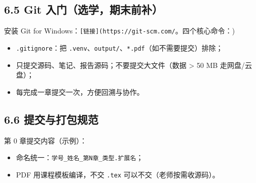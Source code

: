 \subsection{6.5 Git
入门（选学，期末前补）}\label{git-ux5165ux95e8ux9009ux5b66ux671fux672bux524dux8865}

安装 Git for
Windows：\texttt{{[}链接{]}(https://git-scm.com/}。四个核心命令：)

\begin{Shaded}
\begin{Highlighting}[]
\OperatorTok{://}\OperatorTok{/}\OperatorTok{/}   
\OperatorTok{{-}}
\end{Highlighting}
\end{Shaded}

\begin{itemize}
\tightlist
\item
  \texttt{.gitignore}：把
  \texttt{.venv}、\texttt{output/}、\texttt{*.pdf}（如不需要提交）排除；
\item
  只提交源码、笔记、报告源码；不要提交大文件（数据 \textgreater{} 50 MB
  走网盘/云盘）；
\item
  每完成一章提交一次，方便回溯与协作。
\end{itemize}

\subsection{6.6
提交与打包规范}\label{ux63d0ux4ea4ux4e0eux6253ux5305ux89c4ux8303}

第 0 章提交内容（示例）：

\begin{Shaded}
\begin{Highlighting}[]
\end{Highlighting}
\end{Shaded}

\begin{itemize}
\tightlist
\item
  命名统一：\texttt{学号\_姓名\_第N章\_类型.扩展名}；
\item
  PDF 用课程模板编译，不交 \texttt{.tex} 可以不交（老师按需收源码）。
\end{itemize}

